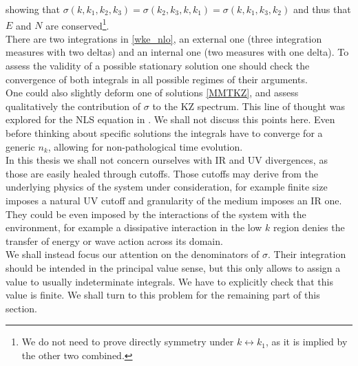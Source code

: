     showing that $\sigma(k,k_1,k_2,k_3) = \sigma(k_2,k_3,k,k_1) = \sigma(k,k_1,k_3,k_2)$ and thus that $E$ and $N$ are conserved\footnote{
    We do not need to prove directly symmetry under $k \leftrightarrow k_1$, as it is implied by the other two combined.}.\\ 
    There are two integrations in \eqref{wke_nlo}, an external one (three integration measures with two deltas) and an internal one (two measures with one delta). 
    To assess the validity of a possible stationary solution one should check the convergence of both integrals in all possible regimes of their arguments.\\ One could also
    slightly deform one of solutions \eqref{MMTKZ}, and assess qualitatively the contribution of $\sigma$ to the KZ spectrum. This line of thought 
    was explored for the NLS equation in \cite{Rosenhaus:2025mgj}. We shall not discuss this points here. Even before thinking about specific solutions 
    the integrals have to converge for a generic $n_k$, allowing for non-pathological time evolution.\\
    In this thesis we shall not concern ourselves with IR and UV divergences,
    as those are easily healed through cutoffs. Those cutoffs may derive from the underlying physics of the system under consideration, for example 
    finite size imposes a natural UV cutoff and granularity of the medium imposes an IR one. They could be even imposed by the interactions of the system with 
    the environment, for example a dissipative interaction in the low $k$ region denies the transfer of energy or wave action across its domain. \\
    We shall instead focus our attention on the denominators of $\sigma$. Their integration should be intended in the principal value sense, but this only allows to 
    assign a value to usually indeterminate integrals. We have to explicitly check that this value is finite. We shall turn to this problem for the remaining part 
    of this section.\\

